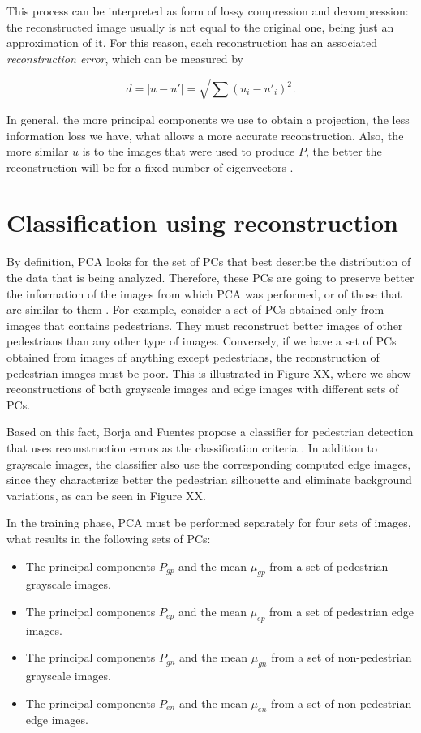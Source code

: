 \documentclass[10pt, conference, compsocconf]{IEEEtran}
\begin{document}
\noindent This process can be interpreted as form of lossy compression and decompression: the reconstructed image usually is not equal to the original one, being just an approximation of it. For this reason, each reconstruction has an associated \emph{reconstruction error}, which can be measured by

\begin{equation}
  d = |u - u'| = \sqrt{\sum{(u_i - u'_i)^2}}.
\end{equation}

In general, the more principal components we use to obtain a projection, the less information loss we have, what allows a more accurate reconstruction. Also, the more similar $u$ is to the images that were used to produce $P$, the better the reconstruction will be for a fixed number of eigenvectors \cite{borja09}.


\section{Classification using reconstruction}

By definition, PCA looks for the set of PCs that best describe the distribution of the data that is being analyzed. Therefore, these PCs are going to preserve better the information of the images from which PCA was performed, or of those that are similar to them \cite{borja09}. For example, consider a set of PCs obtained only from images that contains pedestrians. They must reconstruct better images of other pedestrians than any other type of images. Conversely, if we have a set of PCs obtained from images of anything except pedestrians, the reconstruction of pedestrian images must be poor. This is illustrated in Figure XX, where we show reconstructions of both grayscale images and edge images with different sets of PCs.


Based on this fact, Borja and Fuentes propose a classifier for pedestrian detection that uses reconstruction errors as the classification criteria \cite{borja09}. In addition to grayscale images, the classifier also use the corresponding computed edge images, since they characterize better the pedestrian silhouette and eliminate background variations, as can be seen in Figure XX. 

In the training phase, PCA must be performed separately for four sets of images, what results in the following sets of PCs:

\begin{itemize}
	\item The principal components $P_{gp}$ and the mean $\mu_{gp}$ from a set of pedestrian grayscale images.
	\item The principal components $P_{ep}$ and the mean $\mu_{ep}$ from a set of pedestrian edge images.
	\item The principal components $P_{gn}$ and the mean $\mu_{gn}$ from a set of non-pedestrian grayscale images.
	\item The principal components $P_{en}$ and the mean $\mu_{en}$ from a set of non-pedestrian edge images.
\end{itemize}
\end{document}
